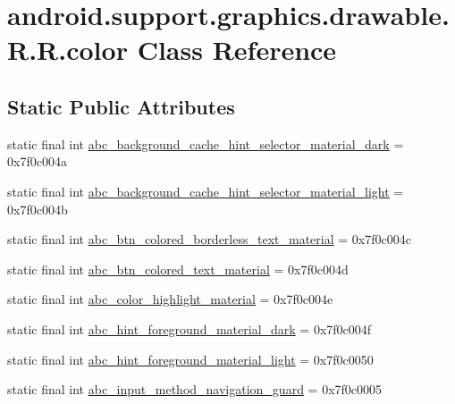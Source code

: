 \hypertarget{classandroid_1_1support_1_1graphics_1_1drawable_1_1_r_1_1color}{
\section{android.support.graphics.drawable.R.R.color Class Reference}
\label{classandroid_1_1support_1_1graphics_1_1drawable_1_1_r_1_1color}
}
\subsection*{Static Public Attributes}
\begin{CompactItemize}
\item 
static final int \hyperlink{classandroid_1_1support_1_1graphics_1_1drawable_1_1_r_1_1color_9b39f10e222a3df0e2d97fd1c5138cf5}{abc\_\-background\_\-cache\_\-hint\_\-selector\_\-material\_\-dark} = 0x7f0c004a
\item 
static final int \hyperlink{classandroid_1_1support_1_1graphics_1_1drawable_1_1_r_1_1color_d99d225a1e3b4d50c04e76d86f254a31}{abc\_\-background\_\-cache\_\-hint\_\-selector\_\-material\_\-light} = 0x7f0c004b
\item 
static final int \hyperlink{classandroid_1_1support_1_1graphics_1_1drawable_1_1_r_1_1color_993f4a0872380f1f56c500801f922167}{abc\_\-btn\_\-colored\_\-borderless\_\-text\_\-material} = 0x7f0c004c
\item 
static final int \hyperlink{classandroid_1_1support_1_1graphics_1_1drawable_1_1_r_1_1color_b398cc0b1a768cbab2a093d6ee906c2f}{abc\_\-btn\_\-colored\_\-text\_\-material} = 0x7f0c004d
\item 
static final int \hyperlink{classandroid_1_1support_1_1graphics_1_1drawable_1_1_r_1_1color_4b3ba77b7866f3affb0c14b2dd428ce0}{abc\_\-color\_\-highlight\_\-material} = 0x7f0c004e
\item 
static final int \hyperlink{classandroid_1_1support_1_1graphics_1_1drawable_1_1_r_1_1color_fce4b7cf915a5f21139ef373b8dcbedc}{abc\_\-hint\_\-foreground\_\-material\_\-dark} = 0x7f0c004f
\item 
static final int \hyperlink{classandroid_1_1support_1_1graphics_1_1drawable_1_1_r_1_1color_4cd3e0377b4664930af69aa0de7d6033}{abc\_\-hint\_\-foreground\_\-material\_\-light} = 0x7f0c0050
\item 
static final int \hyperlink{classandroid_1_1support_1_1graphics_1_1drawable_1_1_r_1_1color_6244f68fb8cda5ee77e98510146f4835}{abc\_\-input\_\-method\_\-navigation\_\-guard} = 0x7f0c0005

\end{CompactItemize}

